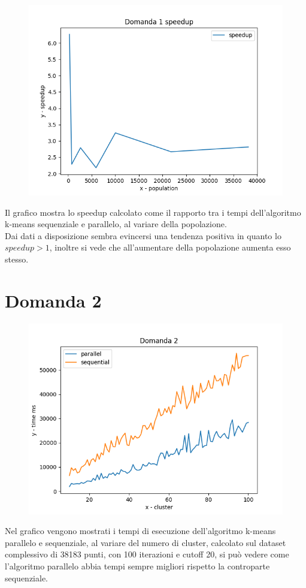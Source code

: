 \documentclass{article}
\begin{document}
\begin{center}
	\begin{figure}[H]
		\includegraphics[width=1\linewidth, valign=t]{figures/domanda1speedup}
	\end{figure}
\end{center}
Il grafico mostra lo speedup calcolato come il rapporto tra i tempi dell'algoritmo k-means sequenziale e parallelo, al variare della popolazione. \\
Dai dati a disposizione sembra evincersi una tendenza positiva in quanto lo $speedup > 1$, inoltre si vede che all'aumentare della popolazione aumenta esso stesso.


\section*{Domanda 2}
\begin{center}
	\begin{figure}[H]
		\includegraphics[width=1\linewidth, valign=t]{figures/domanda2}
	\end{figure}
\end{center}
Nel grafico vengono mostrati i tempi di esecuzione dell'algoritmo k-means parallelo e sequenziale, al variare del numero di cluster, calcolato sul dataset complessivo di 38183 punti, con 100 iterazioni e cutoff 20, si può vedere come l'algoritmo parallelo abbia tempi sempre migliori rispetto la controparte sequenziale.
	
\end{document}
